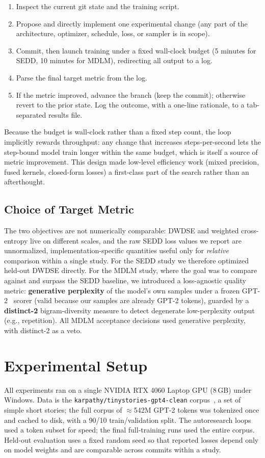 \documentclass[conference]{IEEEtran}
\begin{document}
\begin{enumerate}
\item Inspect the current git state and the training script.
\item Propose and directly implement one experimental change (any part
of the architecture, optimizer, schedule, loss, or sampler is in scope).
\item Commit, then launch training under a fixed wall-clock budget
(5 minutes for SEDD, 10 minutes for MDLM), redirecting all output to a
log.
\item Parse the final target metric from the log.
\item If the metric improved, advance the branch (keep the commit);
otherwise revert to the prior state. Log the outcome, with a one-line
rationale, to a tab-separated results file.
\end{enumerate}

Because the budget is wall-clock rather than a fixed step count, the
loop implicitly rewards throughput: any change that increases
steps-per-second lets the step-bound model train longer within the same
budget, which is itself a source of metric improvement. This design
made low-level efficiency work (mixed precision, fused kernels,
closed-form losses) a first-class part of the search rather than an
afterthought.

\subsection{Choice of Target Metric}
The two objectives are not numerically comparable: DWDSE and weighted
cross-entropy live on different scales, and the raw SEDD loss values we
report are unnormalized, implementation-specific quantities useful only
for \emph{relative} comparison within a single study. For the SEDD study
we therefore optimized held-out DWDSE directly. For the MDLM study,
where the goal was to compare against and surpass the SEDD baseline, we
introduced a loss-agnostic quality metric: \textbf{generative
perplexity} of the model's own samples under a frozen
GPT-2~\cite{gpt2} scorer (valid because our samples are already GPT-2
tokens), guarded by a \textbf{distinct-2} bigram-diversity measure to
detect degenerate low-perplexity output (e.g., repetition). All MDLM
acceptance decisions used generative perplexity, with distinct-2 as a
veto.

\section{Experimental Setup}
All experiments ran on a single NVIDIA RTX 4060 Laptop GPU (8\,GB) under
Windows. Data is the \texttt{karpathy/tinystories-gpt4-clean}
corpus~\cite{tinystories}, a set of simple short stories; the full
corpus of $\approx$542M GPT-2 tokens was tokenized once and cached to
disk, with a 90/10 train/validation split. The autoresearch loops used
a token subset for speed; the final full-training runs used the entire
corpus. Held-out evaluation uses a fixed random seed so that reported
losses depend only on model weights and are comparable across commits
within a study.
\end{document}
